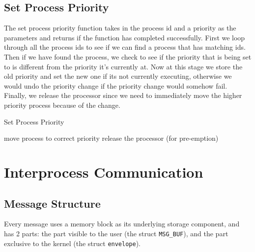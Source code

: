 \documentclass[12pt]{report}
\begin{document}
\subsection{Set Process Priority}

The set process priority function takes in the process id and a priority as the parameters and returns if the function has completed successfully. First we loop through all the process ids to see if we can find a process that has matching ids. Then if we have found the process, we check to see if the priority that is being set to is different from the priority it's currently at. Now at this stage we store the old priority and set the new one if its not currently executing, otherwise we would undo the priority change if the priority change would somehow fail. Finally, we release the processor since we need to immediately move the higher priority process because of the change.

\begin{algorithm}[H]
  \caption{Set Process Priority}
  \begin{algorithmic}[1]
              \State move process to correct priority
            \EndIf     
            \State release the processor (for pre-emption)
          \EndIf
        \EndIf
      \EndFor
    \EndIf
  \EndFunction
  \end{algorithmic}
\end{algorithm}


\section{Interprocess Communication}

\subsection{Message Structure}

Every message uses a memory block as its underlying storage component, and has 2 parts: the part visible to the user (the struct \texttt{MSG_BUF}), and the part exclusive to the kernel (the struct \texttt{envelope}). 
\end{document}

